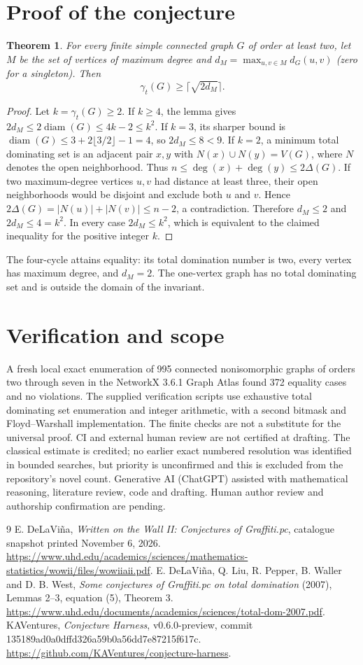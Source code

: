 \documentclass[11pt]{article}
\newtheorem{theorem}{Theorem}
\begin{document}
\section{Proof of the conjecture}
\begin{theorem}
For every finite simple connected graph $G$ of order at least two, let $M$ be the set of vertices of maximum degree and $d_M=\max_{u,v\in M}d_G(u,v)$ (zero for a singleton). Then
\[
 \gamma_t(G)\ge\lceil\sqrt{2d_M}\rceil .
\]
\end{theorem}
\begin{proof}
Let $k=\gamma_t(G)\ge2$. If $k\ge4$, the lemma gives $2d_M\le2\operatorname{diam}(G)\le4k-2\le k^2$. If $k=3$, its sharper bound is $\operatorname{diam}(G)\le3+2\lfloor3/2\rfloor-1=4$, so $2d_M\le8<9$. If $k=2$, a minimum total dominating set is an adjacent pair $x,y$ with $N(x)\cup N(y)=V(G)$, where $N$ denotes the open neighborhood. Thus $n\le\deg(x)+\deg(y)\le2\Delta(G)$. If two maximum-degree vertices $u,v$ had distance at least three, their open neighborhoods would be disjoint and exclude both $u$ and $v$. Hence $2\Delta(G)=|N(u)|+|N(v)|\le n-2$, a contradiction. Therefore $d_M\le2$ and $2d_M\le4=k^2$. In every case $2d_M\le k^2$, which is equivalent to the claimed inequality for the positive integer $k$.
\end{proof}
The four-cycle attains equality: its total domination number is two, every vertex has maximum degree, and $d_M=2$. The one-vertex graph has no total dominating set and is outside the domain of the invariant.
\section{Verification and scope}
A fresh local exact enumeration of 995 connected nonisomorphic graphs of orders two through seven in the NetworkX 3.6.1 Graph Atlas found 372 equality cases and no violations. The supplied verification scripts use exhaustive total dominating set enumeration and integer arithmetic, with a second bitmask and Floyd--Warshall implementation. The finite checks are not a substitute for the universal proof. CI and external human review are not certified at drafting. The classical estimate is credited; no earlier exact numbered resolution was identified in bounded searches, but priority is unconfirmed and this is excluded from the repository's novel count. Generative AI (ChatGPT) assisted with mathematical reasoning, literature review, code and drafting. Human author review and authorship confirmation are pending.
\begin{thebibliography}{9}
 E. DeLaVi\~na, \emph{Written on the Wall II: Conjectures of Graffiti.pc}, catalogue snapshot printed November 6, 2026. \url{https://www.uhd.edu/academics/sciences/mathematics-statistics/wowii/files/wowiiaii.pdf}.
 E. DeLaVi\~na, Q. Liu, R. Pepper, B. Waller and D. B. West, \emph{Some conjectures of Graffiti.pc on total domination} (2007), Lemmas 2--3, equation (5), Theorem 3. \url{https://www.uhd.edu/documents/academics/sciences/total-dom-2007.pdf}.
 KAVentures, \emph{Conjecture Harness}, v0.6.0-preview, commit 135189ad0a0dffd326a59b0a56dd7e87215f617c. \url{https://github.com/KAVentures/conjecture-harness}.
\end{thebibliography}
\end{document}
